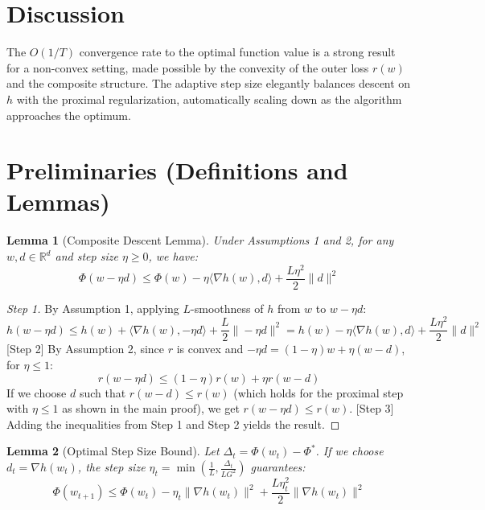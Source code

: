 \documentclass{article}
\newtheorem{lemma}{Lemma}
\begin{document}
\section*{Discussion}
The $O(1/T)$ convergence rate to the optimal function value is a strong result for a non-convex setting, made possible by the convexity of the outer loss $r(w)$ and the composite structure. The adaptive step size elegantly balances descent on $h$ with the proximal regularization, automatically scaling down as the algorithm approaches the optimum.

\section*{Preliminaries (Definitions and Lemmas)}
\begin{lemma}[Composite Descent Lemma]
Under Assumptions 1 and 2, for any $w, d \in \mathbb{R}^d$ and step size $\eta \geq 0$, we have:
\begin{equation}
    \Phi(w - \eta d) \leq \Phi(w) - \eta \langle \nabla h(w), d \rangle + \frac{L \eta^2}{2} \|d\|^2
\end{equation}
\end{lemma}
\begin{proof}
[Step 1] By Assumption 1, applying $L$-smoothness of $h$ from $w$ to $w - \eta d$:
\begin{equation}
    h(w - \eta d) \leq h(w) + \langle \nabla h(w), -\eta d \rangle + \frac{L}{2} \|-\eta d\|^2 = h(w) - \eta \langle \nabla h(w), d \rangle + \frac{L\eta^2}{2}\|d\|^2
\end{equation}
[Step 2] By Assumption 2, since $r$ is convex and $-\eta d = (1-\eta)w + \eta(w-d)$, for $\eta \leq 1$:
\begin{equation}
    r(w - \eta d) \leq (1-\eta)r(w) + \eta r(w - d)
\end{equation}
If we choose $d$ such that $r(w-d) \leq r(w)$ (which holds for the proximal step with $\eta \leq 1$ as shown in the main proof), we get $r(w-\eta d) \leq r(w)$. 
[Step 3] Adding the inequalities from Step 1 and Step 2 yields the result.
\end{proof}

\begin{lemma}[Optimal Step Size Bound]
Let $\Delta_t = \Phi(w_t) - \Phi^*$. If we choose $d_t = \nabla h(w_t)$, the step size $\eta_t = \min\left(\frac{1}{L}, \frac{\Delta_t}{L G^2}\right)$ guarantees:
\begin{equation}
    \Phi(w_{t+1}) \leq \Phi(w_t) - \eta_t \|\nabla h(w_t)\|^2 + \frac{L\eta_t^2}{2}\|\nabla h(w_t)\|^2
\end{equation}
\end{lemma}
\end{document}
